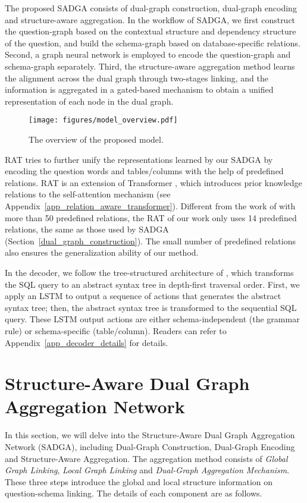 \documentclass{article}
\begin{document}
The proposed SADGA consists of dual-graph construction, dual-graph encoding and structure-aware aggregation. In the workflow of SADGA, we first construct the question-graph based on the contextual structure and dependency structure of the question, and build the schema-graph based on database-specific relations. Second, a graph neural network is employed to encode the question-graph and schema-graph separately. Third, the structure-aware aggregation method learns the alignment across the dual graph through two-stages linking, and the information is aggregated in a gated-based mechanism to obtain a unified representation of each node in the dual graph.

\begin{figure*}[!thb]
  \centering
  \texttt{[image: figures/model\_overview.pdf]} 
  \caption{
  The overview of the proposed model.
  } 
  \label{model_overview}
\end{figure*}

RAT \citep{wang2020rat} tries to further unify the representations learned by our SADGA by encoding the question words and tables/columns with the help of predefined relations. RAT is an extension of Transformer \citep{vaswani2017attention}, which introduces prior knowledge relations to the self-attention mechanism (see Appendix~\ref{app_relation_aware_transformer}). Different from the work of \citet{wang2020rat} with more than 50 predefined relations, the RAT of our work only uses 14 predefined relations, the same as those used by SADGA (Section~\ref{dual_graph_construction}). The small number of predefined relations also ensures the generalization ability of our method.

In the decoder, we follow the tree-structured architecture of \citet{yin2017syntactic}, which transforms the SQL query to an abstract syntax tree in depth-first traversal order. First, we apply an LSTM \citep{hochreiter1997long} to output a sequence of actions that generates the abstract syntax tree; then, the abstract syntax tree is transformed to the sequential SQL query. These LSTM output actions are either schema-independent (the grammar rule) or schema-specific (table/column). Readers can refer to Appendix~\ref{app_decoder_details} for details.

\section{Structure-Aware Dual Graph Aggregation Network}
In this section, we will delve into the Structure-Aware Dual Graph Aggregation Network (SADGA), including Dual-Graph Construction, Dual-Graph Encoding and Structure-Aware Aggregation.
The aggregation method consists of \emph{Global Graph Linking}, \emph{Local Graph Linking} and \emph{Dual-Graph Aggregation Mechanism}. These three steps introduce the global and local structure information on question-schema linking. The details of each component are as follows. 
\end{document}
